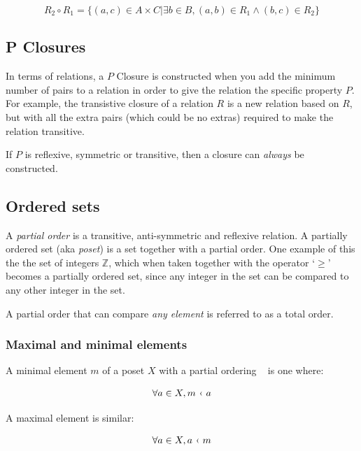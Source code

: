 \[
	R_2 \circ R_1 = \{(a,c) \in A \times C | \exists b \in B, (a,b) \in R_1 \wedge (b,c) \in R_2 \}
\]


\subsection{P Closures}

In terms of relations, a $P$ Closure is constructed when you add the minimum
number of pairs to a relation in order to give the relation the specific
property $P$. For example, the transistive closure of a relation $R$ is a new
relation based on $R$, but with all the extra pairs (which could be no extras)
required to make the relation transitive.

If $P$ is reflexive, symmetric or transitive, then a closure can {\it always} be
constructed.

\subsection{Ordered sets}

A {\it partial order} is a transitive, anti-symmetric and reflexive relation. A
partially ordered set (aka {\it poset}) is a set together with a partial order.
One example of this the the set of integers $\mathbb{Z}$, which when taken
together with the operator `$\geq$' becomes a partially ordered set, since any
integer in the set can be compared to any other integer in the set.

A partial order that can compare {\it any element} is referred to as a total
order.

\subsubsection{Maximal and minimal elements}

A minimal element $m$ of a poset $X$ with a partial ordering \guilsinglleft~
is one where:

\[
	\forall a \in X, m~\textrm{\guilsinglleft}~a
\]

A maximal element is similar:


\[
	\forall a \in X, a~\textrm{\guilsinglleft}~m
\]